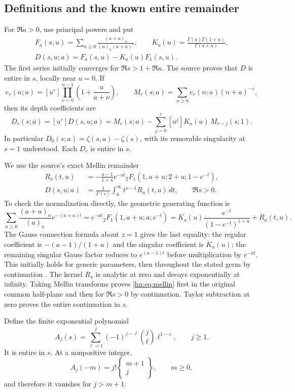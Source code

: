 \documentclass[11pt,a4paper]{article}
\numberwithin{equation}{section}
\theoremstyle{definition}
\theoremstyle{remark}
\begin{document}
\subsection{Definitions and the known entire remainder}

For $\Re a>0$, use principal powers and put
\[
 \begin{gathered}
 F_a(s,u)=\sum_{n\ge0}\frac{(a+u)_n}{(a)_n(n+a)^s},\qquad
 K_a(u)=\frac{\Gamma(a)\Gamma(1+u)}{\Gamma(a+u)},\\[3pt]
 D(s,u;a)=F_a(s,u)-K_a(u)F_1(s,u).
 \end{gathered}
\]
The first series initially converges for $\Re s>1+\Re u$.
The source proves that $D$ is entire in $s$, locally near $u=0$.
If
\[
 e_r(n;a)=[u^r]\prod_{\nu=0}^{n-1}\left(1+\frac{u}{a+\nu}\right),
 \qquad M_r(s;a)=\sum_{n\ge0}e_r(n;a)(n+a)^{-s},
\]
then its depth coefficients are
\[
 D_r(s;a)=[u^r]D(s,u;a)
 =M_r(s;a)-\sum_{j=0}^r[u^j]K_a(u)\,M_{r-j}(s;1).
\]
In particular $D_0(s;a)=\zeta(s,a)-\zeta(s)$, with its removable
singularity at $s=1$ understood. Each $D_r$ is entire in $s$.

We use the source's exact Mellin remainder
\begin{align}
 R_a(t,u)
 &=-\frac{a-1}{1+u}e^{-at}
       {}_2F_1(1,a+u;2+u;1-e^{-t}),\label{hn:eq:R}\\
 D(s,u;a)&=\frac1{\Gamma(s)}\int_0^\infty
                         t^{s-1}R_a(t,u)\,dt,\qquad \Re s>0.
 \label{hn:eq:mellin}
\end{align}
To check the normalization directly, the geometric generating function is
\[
 \sum_{n\ge0}\frac{(a+u)_n}{(a)_n}e^{-(n+a)t}
 =e^{-at}{}_2F_1(1,a+u;a;e^{-t})
 =K_a(u)\frac{e^{-t}}{(1-e^{-t})^{1+u}}+R_a(t,u).
\]
The Gauss connection formula about $z=1$ gives the last equality:
the regular coefficient is $-(a-1)/(1+u)$ and the singular
coefficient is $K_a(u)$; the remaining singular Gauss factor reduces
to $e^{(a-1)t}$ before multiplication by $e^{-at}$.
This initially holds for generic parameters, then throughout the
stated germ by continuation \cite{DLMFHypergeom}.
The kernel $R_a$ is analytic at zero and decays exponentially at infinity.
Taking Mellin transforms proves \eqref{hn:eq:mellin} first in the
original common half-plane and then for $\Re s>0$ by continuation. Taylor subtraction at
zero proves the entire continuation in $s$.

Define the finite exponential polynomial
\begin{equation}\label{hn:eq:Aj}
 A_j(s)=\sum_{\ell=1}^j(-1)^{j-\ell}\binom j\ell\ell^{1-s},
 \qquad j\ge1.
\end{equation}
It is entire in $s$. At a nonpositive integer,
\begin{equation}\label{hn:eq:Stirling}
 A_j(-m)=j!\left\{\begin{matrix}m+1\\j\end{matrix}\right\},
 \qquad m\ge0,
\end{equation}
and therefore it vanishes for $j>m+1$.
\end{document}
